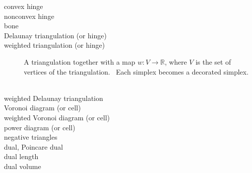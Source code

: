\begin{description}
\item[convex hinge] 

\item[nonconvex hinge] 

\item[bone] 

\item[Delaunay triangulation (or hinge)] 

\item[weighted triangulation (or hinge)] A triangulation together with a map 
$w:V\rightarrow 
\mathbb{R}
$, where $V$ is the set of vertices of the triangulation. \ Each simplex
becomes a decorated simplex. \ 

\item[weighted Delaunay triangulation] 

\item[Voronoi diagram (or cell)] 

\item[weighted Voronoi diagram (or cell)] 

\item[power diagram (or cell)] 

\item[negative triangles] 

\item[dual, Poincare dual] 

\item[dual length] 

\item[dual volume] 
\end{description}

